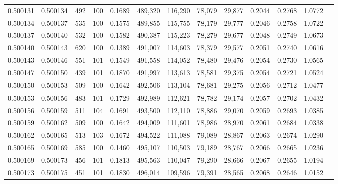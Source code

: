 \begin{tabular}{rrrrrrrrrrrrr}
0.500131 & 0.500134 &   492 & 100 &                                     0.1689 & 489,320 & 116,290 &  78,079 &  29,877 & 0.2044 & 0.2768 & 1.0772 \\
0.500134 & 0.500137 &   535 & 100 &                                     0.1575 & 489,855 & 115,755 &  78,179 &  29,777 & 0.2046 & 0.2758 & 1.0722 \\
0.500137 & 0.500140 &   532 & 100 &                                     0.1582 & 490,387 & 115,223 &  78,279 &  29,677 & 0.2048 & 0.2749 & 1.0673 \\
0.500140 & 0.500143 &   620 & 100 &                                     0.1389 & 491,007 & 114,603 &  78,379 &  29,577 & 0.2051 & 0.2740 & 1.0616 \\
0.500143 & 0.500146 &   551 & 101 &                                     0.1549 & 491,558 & 114,052 &  78,480 &  29,476 & 0.2054 & 0.2730 & 1.0565 \\
0.500147 & 0.500150 &   439 & 101 &                                     0.1870 & 491,997 & 113,613 &  78,581 &  29,375 & 0.2054 & 0.2721 & 1.0524 \\
0.500150 & 0.500153 &   509 & 100 &                                     0.1642 & 492,506 & 113,104 &  78,681 &  29,275 & 0.2056 & 0.2712 & 1.0477 \\
0.500153 & 0.500156 &   483 & 101 &                                     0.1729 & 492,989 & 112,621 &  78,782 &  29,174 & 0.2057 & 0.2702 & 1.0432 \\
0.500156 & 0.500159 &   511 & 104 &                                     0.1691 & 493,500 & 112,110 &  78,886 &  29,070 & 0.2059 & 0.2693 & 1.0385 \\
0.500159 & 0.500162 &   509 & 100 &                                     0.1642 & 494,009 & 111,601 &  78,986 &  28,970 & 0.2061 & 0.2684 & 1.0338 \\
0.500162 & 0.500165 &   513 & 103 &                                     0.1672 & 494,522 & 111,088 &  79,089 &  28,867 & 0.2063 & 0.2674 & 1.0290 \\
0.500165 & 0.500169 &   585 & 100 &                                     0.1460 & 495,107 & 110,503 &  79,189 &  28,767 & 0.2066 & 0.2665 & 1.0236 \\
0.500169 & 0.500173 &   456 & 101 &                                     0.1813 & 495,563 & 110,047 &  79,290 &  28,666 & 0.2067 & 0.2655 & 1.0194 \\
0.500173 & 0.500175 &   451 & 101 &                                     0.1830 & 496,014 & 109,596 &  79,391 &  28,565 & 0.2068 & 0.2646 & 1.0152 \\

\end{tabular}
